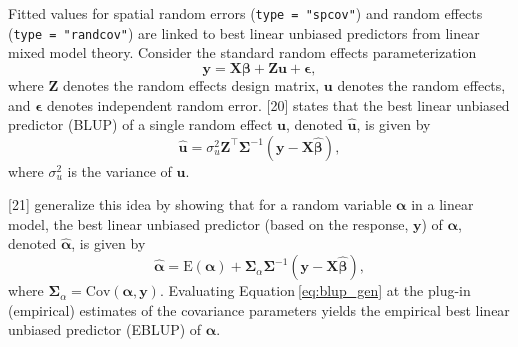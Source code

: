 \documentclass[10pt,letterpaper]{article}
\begin{document}
Fitted values for spatial random errors (\texttt{type\ =\ "spcov"}) and
random effects (\texttt{type\ =\ "randcov"}) are linked to best linear
unbiased predictors from linear mixed model theory. Consider the
standard random effects parameterization \begin{equation*}
  \mathbf{y} = \mathbf{X} \boldsymbol{\beta} + \mathbf{Z} \mathbf{u} + \boldsymbol{\epsilon},
\end{equation*} where \(\mathbf{Z}\) denotes the random effects design
matrix, \(\mathbf{u}\) denotes the random effects, and
\(\boldsymbol{\epsilon}\) denotes independent random error. {[}20{]}
states that the best linear unbiased predictor (BLUP) of a single random
effect \(\mathbf{u}\), denoted \(\mathbf{\hat{u}}\), is given by
\begin{equation}\label{eq:blup_mm}
  \mathbf{\hat{u}} = \sigma^2_u \mathbf{Z}^\top \mathbf{\Sigma}^{-1}(\mathbf{y} - \mathbf{X} \boldsymbol{\hat{\beta}}),
\end{equation} where \(\sigma^2_u\) is the variance of \(\mathbf{u}\).

{[}21{]} generalize this idea by showing that for a random variable
\(\boldsymbol{\alpha}\) in a linear model, the best linear unbiased
predictor (based on the response, \(\mathbf{y}\)) of
\(\boldsymbol{\alpha}\), denoted \(\boldsymbol{\hat{\alpha}}\), is given
by \begin{equation}\label{eq:blup_gen}
  \boldsymbol{\hat{\alpha}} = \text{E}(\boldsymbol{\alpha}) + \boldsymbol{\Sigma}_\alpha \boldsymbol{\Sigma}^{-1}(\mathbf{y} - \mathbf{X} \boldsymbol{\hat{\beta}}),
\end{equation} where
\(\boldsymbol{\Sigma}_\alpha = \text{Cov}(\boldsymbol{\alpha}, \mathbf{y})\).
Evaluating Equation\(~\)\ref{eq:blup_gen} at the plug-in (empirical)
estimates of the covariance parameters yields the empirical best linear
unbiased predictor (EBLUP) of \(\boldsymbol{\alpha}\).
\end{document}
